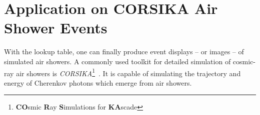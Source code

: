 \section{Application on CORSIKA Air Shower Events}

With the lookup table, one can finally produce event displays -- or images -- of simulated air showers. A commonly used toolkit for detailed simulation of cosmic-ray air showers is \textit{CORSIKA}\footnote{\textbf{CO}smic \textbf{R}ay \textbf{S}imulations for \textbf{KA}scade}~\cite{corsika:website}. It is capable of simulating the trajectory and energy of Cherenkov photons which emerge from air showers.

